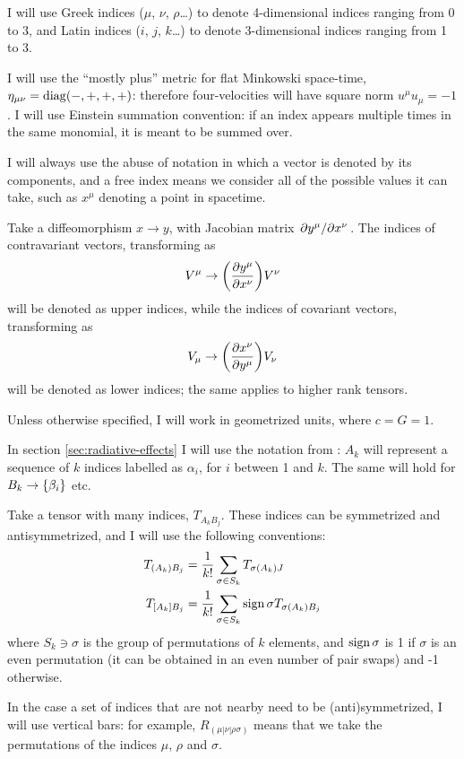 \documentclass[main.tex]{subfiles}
\begin{document}
I will use Greek indices ($\mu$, $\nu$, $\rho$\dots) to denote 4-dimensional indices ranging from 0 to 3, and Latin indices ($i$, $j$, $k$\dots) to denote 3-dimensional indices ranging from 1 to 3.

I will use the ``mostly plus'' metric for flat Minkowski space-time, $\eta_{\mu \nu} = \operatorname{diag}(-, +, +, +)$: therefore four-velocities will have square norm \(u^\mu u_\mu = -1\).
I will use Einstein summation convention: if an index appears multiple times in the same monomial, it is meant to be summed over.

I will always use the abuse of notation in which a vector is denoted by its components, and a free index means we consider all of the possible values it can take, such as \(x^\mu\) denoting a point in spacetime.

Take a diffeomorphism $x \rightarrow y$, with Jacobian matrix $\pdv*{y^\mu}{x^\nu}$.
The indices of contravariant vectors, transforming as
\begin{equation}
    V^\mu \rightarrow \qty( \pdv{y^\mu}{x^\nu})  V^\nu
\end{equation}
will be denoted as upper indices, while the indices of covariant vectors, transforming as
\begin{equation}
V_\mu \rightarrow \qty( \pdv{x^\nu}{y^\mu})  V_\nu
\end{equation}
will be denoted as lower indices; the same applies to higher rank tensors.

Unless otherwise specified, I will work in geometrized units, where $c = G = 1$.

In section \ref{sec:radiative-effects} I will use the notation from \textcite[]{Thorne:1981feb}: \(A_k\) will represent a sequence of \(k\) indices labelled as \(\alpha_i\), for \(i\) between 1 and \(k\). The same will hold for \(B_k \rightarrow \qty{\beta_i}\) etc.

Take a tensor with many indices, \(T_{A_k B_j}\). These indices can be symmetrized and antisymmetrized, and I will use the following conventions:
\begin{align}
    T_{(A_k) B_j } &= \frac{1}{k!} \sum_{\sigma \in S_k} T_{\sigma(A_k)J} \\
    T_{[A_k]B_j} &= \frac{1}{k!} \sum_{\sigma \in S_k} \sign{\sigma} T_{\sigma(A_k)B_j}
\end{align}
where \(S_k \ni \sigma \) is the group of permutations of $k$ elements, and $\operatorname{sign}{\sigma}$ is 1 if $\sigma$ is an even permutation (it can be obtained in an even number of pair swaps) and -1 otherwise.

In the case a set of indices that are not nearby need to be (anti)symmetrized, I will use vertical bars: for example, \(R_{(\mu | \nu| \rho \sigma)}\) means that we take the permutations of the indices \(\mu\), \(\rho\) and \(\sigma\).
\end{document}
